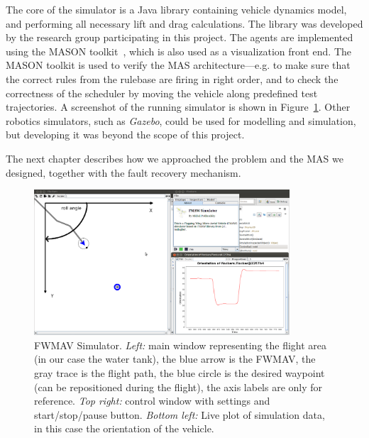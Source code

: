 The core of the simulator is a Java library containing vehicle dynamics model, and performing all necessary lift and drag calculations. The library was developed by the research group participating in this project. The agents are implemented using the MASON toolkit~\cite{mason}, which is also used as a visualization front end. The MASON toolkit is used to verify the MAS architecture---e.g. to make sure that the correct rules from the rulebase are firing in right order, and to check the correctness of the scheduler by moving the vehicle along predefined test trajectories. A screenshot of the running simulator is shown in Figure~\ref{fig:simulator}. Other robotics simulators, such as \textit{Gazebo}, could be used for modelling and simulation, but developing it was beyond the scope of this project.

The next chapter describes how we approached the problem and the MAS we designed, together with the fault recovery mechanism.

\begin{figure}
\centering
\includegraphics[width=0.85\textwidth]{Files/Figures/simulator.png}
\caption[Screenshot of the simulator]{FWMAV Simulator. \textit{Left:} main window representing the flight area (in our case the water tank), the blue arrow is the FWMAV, the gray trace is the flight path, the blue circle is the desired waypoint (can be repositioned during the flight), the axis labels are only for reference. \textit{Top right:} control window with settings and start/stop/pause button. \textit{Bottom left:} Live plot of simulation data, in this case the orientation of the vehicle.}
\label{fig:simulator}
\end{figure}
